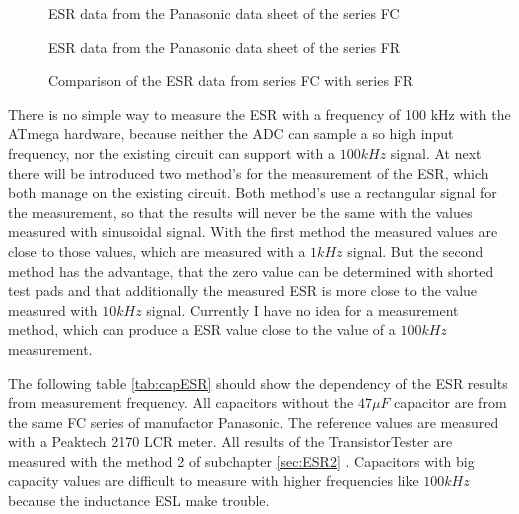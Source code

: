 \begin{figure}[H]
  \centering
    \resizebox{14cm}{!}{}
  \caption{ESR data from the Panasonic data sheet of the series FC}
  \label{fig:Cap_FC_data}
\end{figure}

\begin{figure}[H]
  \centering
    \resizebox{14cm}{!}{}
  \caption{ESR data from the Panasonic data sheet of the series FR}
  \label{fig:Cap_FR_data}
\end{figure}

\begin{figure}[H]
  \centering
    \resizebox{14cm}{!}{}
  \caption{Comparison of the ESR data from series FC with series FR}
  \label{fig:Cap_FC_FR_data}
\end{figure}

There is no simple way to measure the ESR with a frequency of 100 kHz with the ATmega hardware,
because neither the ADC can sample a so high input frequency, nor the existing circuit can support
with a \(100kHz\) signal.
At next there will be introduced two method's for the measurement of the ESR, which both manage on 
the existing circuit.
Both method's use a rectangular signal for the measurement, so that the results will never be
the same with the values measured with sinusoidal signal.
With the first method the measured values are close to those values, which are measured with a
\(1kHz\) signal. 
But the second method has the advantage, that the zero value can be determined with shorted test pads and
that additionally the measured ESR is more close to the value measured with \(10kHz\) signal.
Currently I have no idea for a measurement method, which can produce a ESR value close to the
value of a \(100kHz\) measurement.

The following table \ref{tab:capESR} should show the dependency of the ESR results from measurement frequency.
All capacitors without the \(47\mu F\) capacitor are from the same FC series of manufactor Panasonic.
The reference values are measured with a Peaktech 2170 LCR meter.
All results of the TransistorTester are measured with the method 2 of subchapter \ref{sec:ESR2} .
Capacitors with big capacity values are difficult to measure with higher frequencies like \(100kHz\) because
the inductance ESL make trouble.

